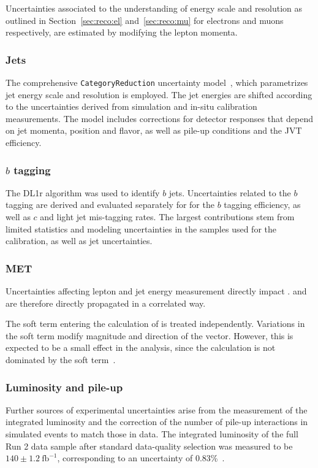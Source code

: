 Uncertainties associated to the understanding of energy scale and resolution as outlined in  Section~\ref{sec:reco:el} and~\ref{sec:reco:mu} for electrons and muons respectively, are estimated by modifying the lepton momenta. 

\subsubsection{Jets}

The comprehensive \verb|CategoryReduction| uncertainty model~\cite{web:JetSystematics},
which parametrizes jet energy scale and resolution is employed.
The jet energies are shifted according to the uncertainties derived
from simulation and in-situ calibration measurements.
The model includes corrections for detector responses that depend on jet momenta,
position and flavor, as well as pile-up conditions and the JVT efficiency.

\subsubsection{$b$ tagging}

The DL1r algorithm  was used to identify $b$ jets.
Uncertainties related to the $b$ tagging are derived and evaluated separately for 
for the $b$ tagging efficiency, as well as $c$ and light jet mis-tagging rates.
The largest contributions stem from limited statistics and modeling uncertainties in the samples used
for the calibration, as well as jet uncertainties.

\subsubsection{MET}

Uncertainties affecting lepton and jet energy measurement directly impact \ETmiss.
and are therefore directly propagated in a correlated way.

The soft term entering the calculation of \ETmiss is treated independently.
Variations in the soft term modify magnitude and direction of the \ETmiss vector.
However, this is expected to be a small effect in the analysis, since the
\ETmiss calculation is not dominated by the soft term~\cite{JETM-2020-03}.

\subsubsection{Luminosity and pile-up}

Further sources of experimental uncertainties arise from the measurement of
the integrated luminosity and the correction of the number of pile-up interactions in simulated events to match those in data.
The integrated luminosity of the full Run 2 data sample after standard data-quality selection was
measured to be $140\pm 1.2~\text{fb}^{-1}$, corresponding to an uncertainty of 0.83\%~\cite{DAPR-2021-01}.

